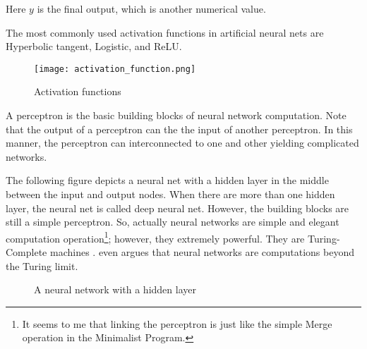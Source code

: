 Here $y$ is the final output, which is another numerical value. 

The most commonly used activation functions in artificial neural nets are Hyperbolic tangent, Logistic, and ReLU.

\begin{figure}
\caption{Activation functions}
\centering
\texttt{[image: activation\_function.png]}
\end{figure} 

A perceptron is the basic building blocks of neural network computation. Note that the output of a perceptron can the the input of another perceptron. 
In this manner, the perceptron can interconnected to one and other yielding complicated networks. 



The following figure depicts a neural net with a hidden layer in the middle between the input and output nodes. When there are more than one hidden layer, the neural net is called deep neural net. However, the building blocks are still a simple perceptron. So, actually neural networks are simple and elegant computation operation\footnote{It seems to me that linking the perceptron is just like the simple Merge operation in the Minimalist Program.}; 
however, they extremely powerful. They are Turing-Complete machines \citep{siegelmann1991turing, graves2014neural}. \citet{siegelmann2003neural, siegelmann2012neural} even argues that neural networks are computations beyond the Turing limit. 

\begin{figure}[h]
\caption{A neural network with a hidden layer}
\centering
{}
\end{figure}    

